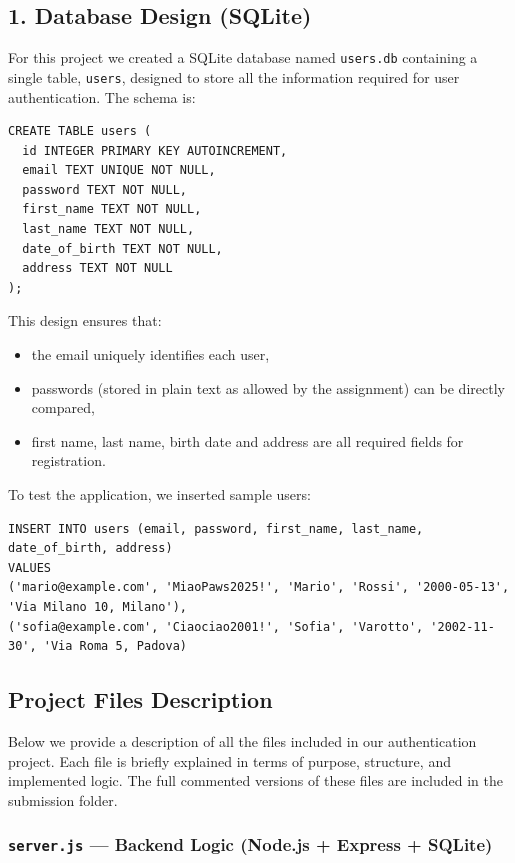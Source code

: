 \documentclass[11pt,a4paper]{report}
\begin{document}
\subsection{1. Database Design (SQLite)}
For this project we created a SQLite database named \texttt{users.db} containing a single table, \texttt{users}, designed to store all the information required for user authentication. The schema is:

\begin{lstlisting}
CREATE TABLE users (
  id INTEGER PRIMARY KEY AUTOINCREMENT,
  email TEXT UNIQUE NOT NULL,
  password TEXT NOT NULL,
  first_name TEXT NOT NULL,
  last_name TEXT NOT NULL,
  date_of_birth TEXT NOT NULL,
  address TEXT NOT NULL
);
\end{lstlisting}

This design ensures that:
\begin{itemize}
    \item the email uniquely identifies each user,
    \item passwords (stored in plain text as allowed by the assignment) can be directly compared,
    \item first name, last name, birth date and address are all required fields for registration.
\end{itemize}
To test the application, we inserted sample users:

\begin{lstlisting}
INSERT INTO users (email, password, first_name, last_name, date_of_birth, address)
VALUES 
('mario@example.com', 'MiaoPaws2025!', 'Mario', 'Rossi', '2000-05-13', 'Via Milano 10, Milano'),
('sofia@example.com', 'Ciaociao2001!', 'Sofia', 'Varotto', '2002-11-30', 'Via Roma 5, Padova)
\end{lstlisting}

\subsection{Project Files Description}
Below we provide a description of all the files included in our authentication project.
 Each file is briefly explained in terms of purpose, structure, and implemented logic.
 The full commented versions of these files are included in the submission folder.

 \subsubsection{\texttt{server.js} — Backend Logic (Node.js + Express + SQLite)}
\end{document}
